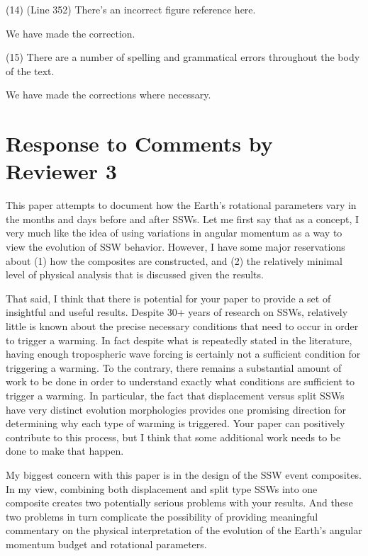 \documentclass[a4paper,10pt]{article}
\begin{document}
\noindent \textcolor{reviewer}{(14) (Line 352) There's an incorrect figure reference here.}
\vspace{0.5cm}

We have made the correction.
\vspace{0.5cm}


\noindent \textcolor{reviewer}{(15) There are a number of spelling and grammatical errors throughout the body of the text.}
\vspace{0.5cm}

We have made the corrections where necessary.  



\section{Response to Comments by Reviewer 3}


\textcolor{reviewer}{This paper attempts to document how the Earth’s rotational parameters vary in the
months and days before and after SSWs. Let me first say that as a concept, I very much
like the idea of using variations in angular momentum as a way to view the evolution of
SSW behavior. However, I have some major reservations about (1) how the composites
are constructed, and (2) the relatively minimal level of physical analysis that is discussed
given the results.}

\textcolor{reviewer}{That said, I think that there is potential for your paper to provide a set of insightful and
useful results. Despite 30+ years of research on SSWs, relatively little is known about the
precise necessary conditions that need to occur in order to trigger a warming. In fact
despite what is repeatedly stated in the literature, having enough tropospheric wave
forcing is certainly not a sufficient condition for triggering a warming. To the contrary,
there remains a substantial amount of work to be done in order to understand exactly
what conditions are sufficient to trigger a warming. In particular, the fact that
displacement versus split SSWs have very distinct evolution morphologies provides one
promising direction for determining why each type of warming is triggered. Your paper
can positively contribute to this process, but I think that some additional work needs to be
done to make that happen.}

\textcolor{reviewer}{My biggest concern with this paper is in the design of the SSW event composites. In my
view, combining both displacement and split type SSWs into one composite creates two
potentially serious problems with your results. And these two problems in turn
complicate the possibility of providing meaningful commentary on the physical
interpretation of the evolution of the Earth’s angular momentum budget and rotational
parameters.}
\end{document}
